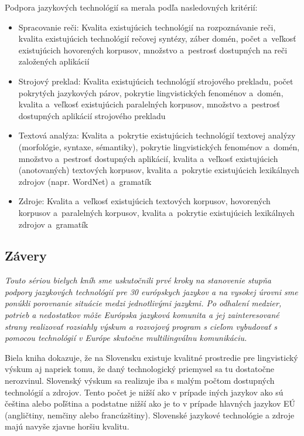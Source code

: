 \begin{multicols}{2}
Podpora jazykových technológií sa merala podľa nasledovných kritérií:

\begin{itemize}
\item Spracovanie reči: Kvalita existujúcich technológií na rozpoznávanie reči, kvalita existujúcich technológií rečovej syntézy, záber domén, počet a~veľkosť existujúcich hovorených korpusov, množstvo a~pestrosť dostupných na reči založených aplikácií
\item Strojový preklad: Kvalita existujúcich technológií strojového prekladu, počet pokrytých jazykových párov, pokrytie lingvistických fenoménov a~domén, kvalita a~veľkosť existujúcich paralelných korpusov, množstvo a~pestrosť dostupných aplikácií strojového prekladu
\item Textová analýza: Kvalita a~pokrytie existujúcich technológií textovej analýzy (morfológie, syntaxe, sémantiky), pokrytie lingvistických fenoménov a~domén, množstvo a~pestrosť dostupných aplikácií, kvalita a~veľkosť existujúcich (anotovaných) textových korpusov, kvalita a~pokrytie existujúcich lexikálnych zdrojov (napr. WordNet) a~gramatík
\item Zdroje: Kvalita a~veľkosť existujúcich textových korpusov, hovorených korpusov a~paralelných korpusov, kvalita a~pokrytie existujúcich lexikálnych zdrojov a~gramatík\\
\end{itemize} 
\subsection{Závery}
\emph{Touto sériou bielych kníh sme uskutočnili prvé kroky na stanovenie stupňa podpory jazykových technológií pre 30 európskych jazykov a na vysokej úrovni sme ponúkli porovnanie situácie medzi jednotlivými jazykmi. Po odhalení medzier, potrieb a nedostatkov môže Európska jazyková komunita a jej zainteresované strany realizovať rozsiahly výskum a rozvojový program s cieľom vybudovať s pomocou technológií v Európe skutočne multilingválnu komunikáciu.}

Biela kniha dokazuje, že na Slovensku existuje kvalitné prostredie pre
lingvistický výskum aj napriek tomu, že daný technologický priemysel sa tu
dostatočne nerozvinul. Slovenský výskum sa realizuje iba s malým počtom
dostupných technológií a zdrojov. Tento počet je nižší ako v prípade iných
jazykov ako sú čeština alebo poľština a podstatne nižší ako je to v prípade
hlavných jazykov EÚ (angličtiny, nemčiny alebo francúzštiny). Slovenské jazykové
technológie a zdroje majú navyše zjavne horšiu kvalitu.


\end{multicols}
